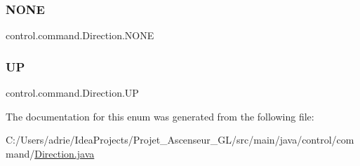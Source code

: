\subsubsection{\texorpdfstring{NONE}{NONE}}
{\footnotesize\ttfamily control.\+command.\+Direction.\+N\+O\+NE}

\mbox{\label{enumcontrol_1_1command_1_1_direction_adb50bdf4a75fea7f0cb851c1e5a42dd9}} 
\subsubsection{\texorpdfstring{UP}{UP}}
{\footnotesize\ttfamily control.\+command.\+Direction.\+UP}



The documentation for this enum was generated from the following file\+:\begin{DoxyCompactItemize}
\item 
C\+:/\+Users/adrie/\+Idea\+Projects/\+Projet\+\_\+\+Ascenseur\+\_\+\+G\+L/src/main/java/control/command/\mbox{\hyperlink{_direction_8java}{Direction.\+java}}\end{DoxyCompactItemize}
